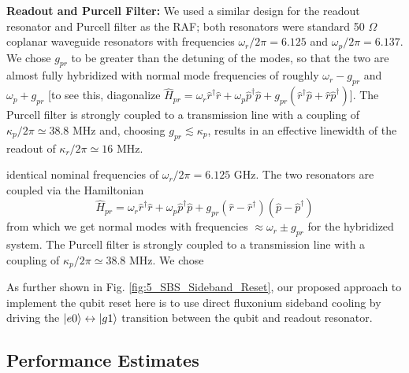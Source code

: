 \noindent \textbf{Readout and Purcell Filter:} We used a similar design for the readout resonator and Purcell filter as the RAF; both resonators were standard 50 $\Omega$ coplanar waveguide resonators with frequencies $\omega_r/2\pi = 6.125$ and $\omega_p/2\pi = 6.137$. We chose $g_{pr}$ to be greater than the detuning of the modes, so that the two are almost fully hybridized with normal mode frequencies of roughly $\omega_r - g_{pr}$ and $\omega_p + g_{pr}$ [to see this, diagonalize $\hat{H}_{pr} = \omega_r\hat{r}^\dagger \hat{r} + \omega_p\hat{p}^\dagger \hat{p} + g_{pr}(\hat{r}^\dagger\hat{p} + \hat{r}\hat{p}^\dagger)$]. The Purcell filter is strongly coupled to a transmission line with a coupling of $\kappa_p/2\pi \simeq 38.8$ MHz and, choosing $g_{pr} \lesssim \kappa_p$, results in an effective linewidth of the readout of $\kappa_r/2\pi \simeq 16$ MHz. 


identical nominal frequencies of $\omega_r/2\pi = 6.125$ GHz. The two resonators are coupled via the Hamiltonian
\begin{equation}
    \hat{H}_{pr} = \omega_r\hat{r}^\dagger \hat{r} + \omega_p\hat{p}^\dagger \hat{p} + g_{pr}(\hat{r}-\hat{r}^\dagger)(\hat{p} - \hat{p}^\dagger)
\end{equation}
from which we get normal modes with frequencies $\approx \omega_r \pm g_{pr}$ for the hybridized system. The Purcell filter is strongly coupled to a transmission line with a coupling of $\kappa_p/2\pi \simeq 38.8$ MHz. We chose 


As further shown in Fig. \ref{fig:5_SBS_Sideband_Reset}, our proposed approach to implement the qubit reset here is to use direct fluxonium sideband cooling by driving the $\lvert e0\rangle\leftrightarrow\lvert g1\rangle$ transition between the qubit and readout resonator. 


\subsection{Performance Estimates}


